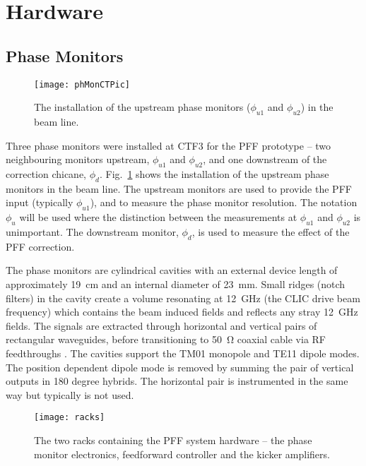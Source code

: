 \section{\label{s:hw}Hardware}

\subsection{\label{ss:phMon}Phase Monitors}

\begin{figure}
  \texttt{[image: phMonCTPic]}
  \caption{\label{f:phMonCTPic}The installation of the upstream phase 
    monitors (\(\phi_{u1}\) and \(\phi_{u2}\)) in the beam line.}
\end{figure}

Three phase monitors were installed at CTF3 for the PFF prototype -- two 
neighbouring monitors upstream, \(\phi_{u1}\) and \(\phi_{u2}\), and one 
downstream of the correction chicane, \(\phi_{d}\). Fig.~\ref{f:phMonCTPic} 
shows the installation of the upstream phase monitors 
in the beam line. The upstream monitors are 
used to provide the PFF input (typically \(\phi_{u1}\)), and to measure the 
phase monitor resolution. The notation \(\phi_u\) 
will be used where the distinction between the measurements at \(\phi_{u1}\) 
and \(\phi_{u2}\) is unimportant. The downstream monitor, \(\phi_{d}\), is used 
to measure the effect of the PFF correction.

The phase monitors are cylindrical cavities with an external device length of 
approximately 19~cm and an internal diameter of 23~mm. Small ridges (notch 
filters) in the cavity create 
a volume resonating at 12~GHz (the CLIC drive beam frequency) which contains 
the beam induced fields and reflects any stray 12~GHz fields. The signals are 
extracted through horizontal and vertical pairs of rectangular waveguides, 
before transitioning to 50~\(\mathrm{\Omega}\) coaxial cable via RF 
feedthroughs \cite{phMonIPAC10}. The cavities support the TM01 monopole and 
TE11 dipole modes. The position dependent dipole mode is removed by summing the 
pair of vertical outputs in 180 degree hybrids. The horizontal pair is 
instrumented in the same way but typically is not used. 

\begin{figure}
  \texttt{[image: racks]}%
  \caption{\label{f:racks}The two racks containing the PFF system hardware -- 
    the phase monitor electronics, feedforward controller and the kicker 
    amplifiers.}
\end{figure}

